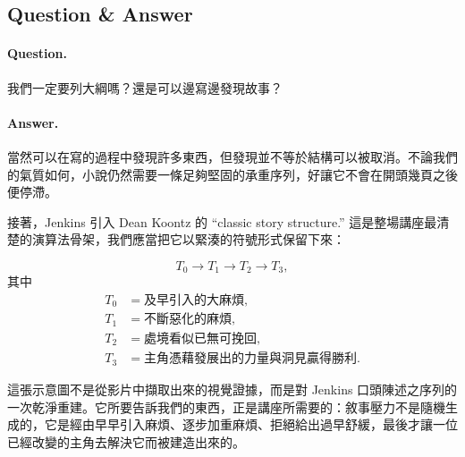 \subsection{Question \& Answer}

\paragraph{Question.} 我們一定要列大綱嗎？還是可以邊寫邊發現故事？

\paragraph{Answer.} 當然可以在寫的過程中發現許多東西，但發現並不等於結構可以被取消。不論我們的氣質如何，小說仍然需要一條足夠堅固的承重序列，好讓它不會在開頭幾頁之後便停滯。

接著，Jenkins 引入 Dean Koontz 的 ``classic story structure.'' 這是整場講座最清楚的演算法骨架，我們應當把它以緊湊的符號形式保留下來：

\begin{equation}
T_0 \to T_1 \to T_2 \to T_3,
\end{equation}
其中
\begin{align}
T_0&=\text{及早引入的大麻煩},\\
T_1&=\text{不斷惡化的麻煩},\\
T_2&=\text{處境看似已無可挽回},\\
T_3&=\text{主角憑藉發展出的力量與洞見贏得勝利}.
\end{align}

\begin{figure}
\centering
{}
\end{figure}

這張示意圖不是從影片中擷取出來的視覺證據，而是對 Jenkins 口頭陳述之序列的一次乾淨重建。它所要告訴我們的東西，正是講座所需要的：敘事壓力不是隨機生成的，它是經由早早引入麻煩、逐步加重麻煩、拒絕給出過早舒緩，最後才讓一位已經改變的主角去解決它而被建造出來的。


